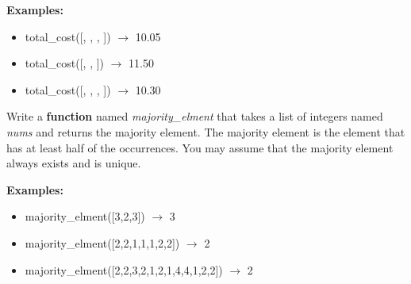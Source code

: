 	\textbf{Examples:}  
	\begin{itemize}  
		\item total\_cost([, , , ]) $\rightarrow$ 10.05
		\item total\_cost([, , ]) $\rightarrow$ 11.50
		\item total\_cost([, , , ]) $\rightarrow$ 10.30
	\end{itemize}



\item
	Write a \textbf{function} named \textit{majority\_elment} that takes a list of integers named \textit{nums} and returns the majority element. The majority element is the element that has at least half of the occurrences. You may assume that the majority element always exists and is unique.
	
	\textbf{Examples:}  
	\begin{itemize}  
		\item majority\_elment([3,2,3]) $\rightarrow$ 3
		\item majority\_elment([2,2,1,1,1,2,2]) $\rightarrow$ 2
		\item majority\_elment([2,2,3,2,1,2,1,4,4,1,2,2]) $\rightarrow$ 2
	\end{itemize}


